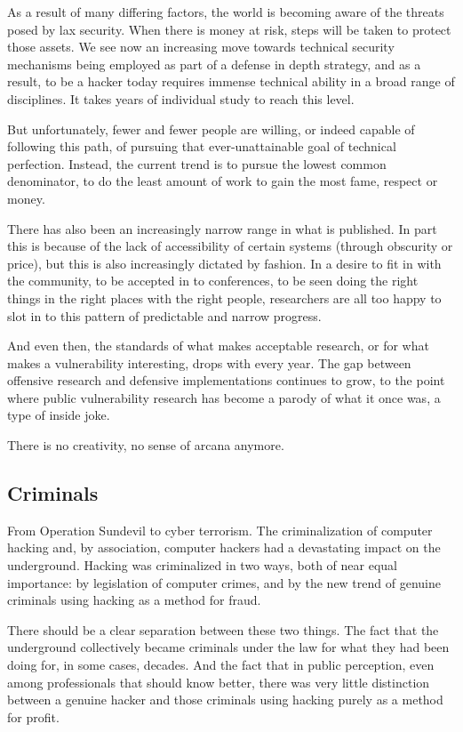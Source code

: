 \documentclass[letterpaper,12pt,english]{sphinxmanual}
\begin{document}
As a result of many differing factors, the world is becoming aware of the
threats posed by lax security. When there is money at risk, steps will
be taken to protect those assets. We see now an increasing move towards
technical security mechanisms being employed as part of a defense in
depth strategy, and as a result, to be a hacker today requires immense
technical ability in a broad range of disciplines. It takes years of
individual study to reach this level.

But unfortunately, fewer and fewer people are willing, or indeed capable
of following this path, of pursuing that ever-unattainable goal of
technical perfection. Instead, the current trend is to pursue the lowest
common denominator, to do the least amount of work to gain the most fame,
respect or money.

There has also been an increasingly narrow range in what is published. In
part this is because of the lack of accessibility of certain systems
(through obscurity or price), but this is also increasingly dictated by
fashion. In a desire to fit in with the community, to be accepted in
to conferences, to be seen doing the right things in the right places
with the right people, researchers are all too happy to slot in to this
pattern of predictable and narrow progress.

And even then, the standards of what makes acceptable research, or for
what makes a vulnerability interesting, drops with every year. The gap
between offensive research and defensive implementations continues to
grow, to the point where public vulnerability research has become a
parody of what it once was, a type of inside joke.

There is no creativity, no sense of arcana anymore.


\subsection{Criminals}
\label{underground-myth:criminals}
From Operation Sundevil to cyber terrorism. The criminalization of
computer hacking and, by association, computer hackers had a devastating
impact on the underground. Hacking was criminalized in two ways, both
of near equal importance: by legislation of computer crimes, and by the
new trend of genuine criminals using hacking as a method for fraud.

There should be a clear separation between these two things. The fact
that the underground collectively became criminals under the law for
what they had been doing for, in some cases, decades. And the fact that
in public perception, even among professionals that should know better,
there was very little distinction between a genuine hacker and those
criminals using hacking purely as a method for profit.
\end{document}
